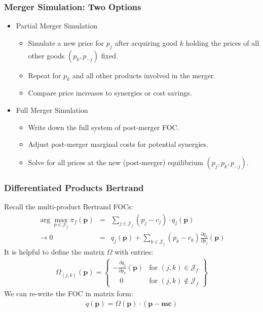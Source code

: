 \documentclass[xcolor=pdftex,dvipsnames,table,mathserif,aspectratio=169]{beamer}
\begin{document}
\begin{frame}
\frametitle{Merger Simulation: Two Options}
 \begin{itemize}
\item Partial Merger Simulation
 \begin{itemize}
\item Simulate a new price for $p_j$ after acquiring good $k$ holding the prices of all other goods $(p_k,p_{-j})$ fixed.
\item Repeat for $p_k$ and all other products involved in the merger.
\item Compare price increases to \alert{synergies} or cost savings.
 \end{itemize}
 \item Full Merger Simulation
 \begin{itemize}
\item Write down the full system of post-merger FOC.
\item Adjust post-merger marginal costs for potential synergies.
\item Solve for all prices at the new (post-merger) equilibrium $(p_j,p_k,p_{-j})$.
 \end{itemize}
 \end{itemize}
\end{frame}

\begin{frame}
\frametitle{Differentiated Products Bertrand}
Recall the multi-product Bertrand FOCs:
\begin{eqnarray*}
\arg \max_{p \in \mathcal{J}_f} \pi_f (\mathbf{p}) &=& \sum_{j \in \mathcal{J}_f} (p_j - c_j) \cdot q_j(\mathbf{p}) \\
\rightarrow 0&=& q_j(\mathbf{p}) + \sum_{k \in \mathcal{J}_f} (p_k - c_k) \frac{\partial q_{k}}{\partial p_j}(\mathbf{p})
\end{eqnarray*}
It is helpful to define the matrix $\Omega$ with entries:
\begin{eqnarray*}
\Omega_{(j,k)}(\mathbf{p}) = \left\{\begin{array}{lr}
         - \frac{\partial q_{j}}{\partial p_k}(\mathbf{p}) & \text{for }  (j,k) \in \mathcal{J}_f\\
       	  \quad 0 & \text{for } (j,k) \notin \mathcal{J}_f
        \end{array} \right\}
\end{eqnarray*}
We can re-write the FOC in matrix form:
\begin{eqnarray*}
q(\mathbf{p}) = \Omega(\mathbf{p})\cdot(\mathbf{p}-\mathbf{mc})
\end{eqnarray*}
\end{frame}
\end{document}
